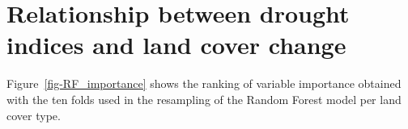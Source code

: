 \documentclass[
  authoryear,
  preprint,
  3p,
  onecolumn]{elsarticle}
\begin{document}
\section{Relationship between drought indices and land cover
change}\label{relationship-between-drought-indices-and-land-cover-change}

Figure~\ref{fig-RF_importance} shows the ranking of variable importance
obtained with the ten folds used in the resampling of the Random Forest
model per land cover type.

\begin{figure}[!ht]

\begin{minipage}{0.33\linewidth}



\end{minipage}
\end{figure}
\end{document}
